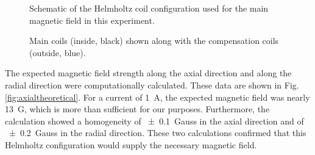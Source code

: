 \begin{figure}[htpb]
	\centering
	
	\caption{Schematic of the Helmholtz coil configuration used for the main magnetic field in this experiment.}
	\label{fig:helmholtzcoils}
\end{figure}



\begin{figure}[htpb]
	\centering
	\caption{Main coils (inside, black) shown along with the compensation coils (outside, blue).}
	\label{fig:actualcoils}
\end{figure}

The expected magnetic field strength along the axial direction and along the radial direction were computationally calculated. These data are shown in Fig. \ref{fig:axialtheoretical}. For a current of \SI{1}{ A}, the expected magnetic field was nearly \SI{13}{ G}, which is more than sufficient for our purposes. Furthermore, the calculation showed a homogeneity of \SI{\pm 0.1}{ Gauss} in the axial direction and of \SI{\pm 0.2}{ Gauss} in the radial direction. These two calculations confirmed that this Helmholtz configuration would supply the necessary magnetic field.

